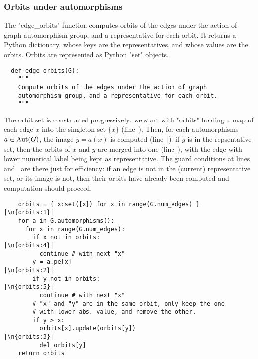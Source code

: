 \subsubsection{Orbits under automorphisms}
The "edge_orbits" function computes orbits of the edges under the
action of graph automorphism group, and a representative for each
orbit.  It returns a Python dictionary, whose keys are the
representatives, and whose values are the orbits.  Orbits are
represented as Python "set" objects.
\begin{lstlisting}
  def edge_orbits(G):
    """
    Compute orbits of the edges under the action of graph
    automorphism group, and a representative for each orbit.
    """
\end{lstlisting}
The orbit set is constructed progressively: we start with "orbits"
holding a map of each edge $x$ into the singleton set $\{x\}$
(line~). Then, for each automorphisms $a \in \operatorname{Aut}(G)$,
the image $y = a(x)$ is computed (line~|); if $y$ is
in the repsentative set, then the orbits of $x$ and $y$ are merged
into one (line~), with the edge with lower numerical
label being kept as representative.  The guard conditions at
lines~ and~ are there just for efficiency:
if an edge is not in the (current) representative set, or its image is
not, then their orbits have already been computed and computation
should proceed.
\begin{lstlisting}
    orbits = { x:set([x]) for x in range(G.num_edges) }  |\n{orbits:1}|
    for a in G.automorphisms():                          
      for x in range(G.num_edges):
        if x not in orbits:                              |\n{orbits:4}|
          continue # with next "x"
        y = a.pe[x]                                      |\n{orbits:2}|
        if y not in orbits:                              |\n{orbits:5}|
          continue # with next "x"
        # "x" and "y" are in the same orbit, only keep the one
        # with lower abs. value, and remove the other.
        if y > x:
          orbits[x].update(orbits[y])                    |\n{orbits:3}|
          del orbits[y]
    return orbits

\end{lstlisting}

